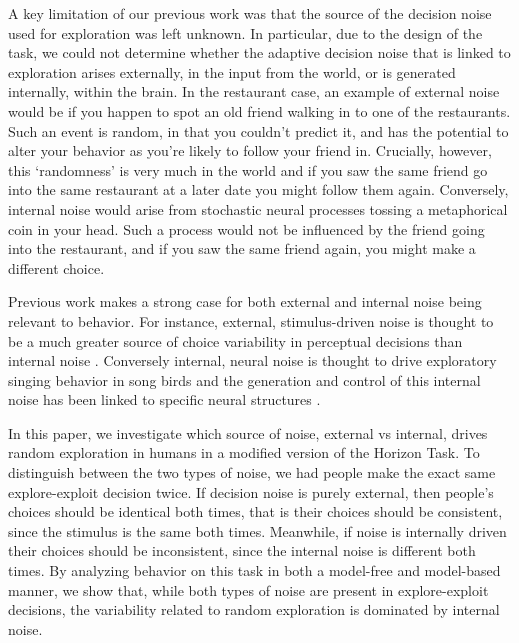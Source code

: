 \documentclass[12pt]{article}
\begin{document}
	
	A key limitation of our previous work was that the source of the decision noise used for exploration was left unknown.  In particular, due to the design of the task, we could not determine whether the adaptive decision noise that is linked to exploration arises externally, in the input from the world, or is generated internally, within the brain. 
	In the restaurant case, an example of external noise would be if you happen to spot an old friend walking in to one of the restaurants. Such an event is random, in that you couldn't predict it, and has the potential to alter your behavior as you're likely to follow your friend in. Crucially, however, this `randomness' is very much in the world and if you saw the same friend go into the same restaurant at a later date you might follow them  again. 
	Conversely, internal noise would arise from stochastic neural processes tossing a metaphorical coin in your head. Such a process would not be influenced by the friend going into the restaurant, and if you saw the same friend again, you might make a different choice. 
	
	Previous work makes a strong case for both external and internal noise being relevant to behavior. For instance, external, stimulus-driven noise is thought to be a much greater source of choice variability in perceptual decisions than internal noise \citep{eeBrunton13}. Conversely internal, neural noise is thought to drive exploratory singing behavior in song birds  \citep{songbird2} and the generation and control of this internal noise has been linked to specific neural structures \citep{songbird2}. 
	
	In this paper, we investigate which source of noise, external vs internal, drives random exploration in humans in a modified version of the Horizon Task. To distinguish between the two types of noise, we had people make the exact same explore-exploit decision twice. If decision noise is purely external, then people's choices should be identical both times, that is their choices should be consistent, since the stimulus is the same both times. Meanwhile, if noise is internally driven their choices should be inconsistent, since the internal noise is different both times. By analyzing behavior on this task in both a model-free and model-based manner, we show that, while both types of noise are present in explore-exploit decisions, the variability related to random exploration is dominated by internal noise.
	
\end{document}
